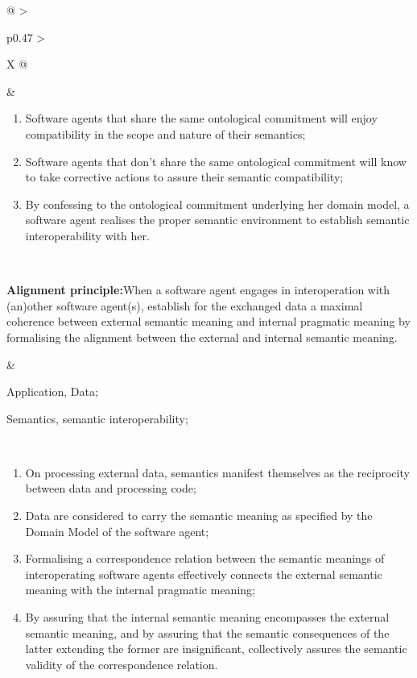 \begin{xltabular}[l]{\linewidth}{@{} >{\small\raggedright\arraybackslash}p{0.47\linewidth} >{\small\raggedright\arraybackslash}X @{}}
\begin{enumerate}[left=6pt, nosep]
\end{enumerate}
&
\begin{enumerate}[left=10pt, nosep]
  \item Software agents that share the same ontological commitment will enjoy compatibility in the scope and nature of their semantics;
  \item Software agents that don’t share the same ontological commitment will know to take corrective actions to assure their semantic compatibility;
  \item By confessing to the ontological commitment underlying her domain model, a software agent realises the proper semantic environment to establish semantic interoperability with her.
\end{enumerate} \\
%
%
%
\begin{mmdp}\label{dp:alignment}{\bfseries Alignment principle:}\quad When a software agent engages in interoperation with (an)other software agent(s), establish for the exchanged data a maximal coherence between external semantic meaning and internal pragmatic meaning by formalising the alignment between the external and internal semantic meaning. \end{mmdp}
&
\begin{description}[labelwidth=3.7cm,leftmargin=3.7cm+1ex,nosep,topsep=2ex,labelsep=1ex,font=\bfseries]
  \item[Type of information:] Application, Data;
  \item[Quality attributes:] Semantics, semantic interoperability;
\end{description}\\
\begin{enumerate}[left=6pt, nosep]
  \item On processing external data, semantics manifest themselves as the reciprocity between data and processing code;
  \item Data are considered to carry the semantic meaning as specified by the Domain Model of the software agent;
  \item Formalising a correspondence relation between the semantic meanings of interoperating software agents effectively connects the external semantic meaning with the internal pragmatic meaning;
  \item By assuring that the internal semantic meaning encompasses the external semantic meaning, and by assuring that the semantic consequences of the latter extending the former are insignificant, collectively assures the semantic validity of the correspondence relation.

\end{enumerate}
\end{xltabular}
